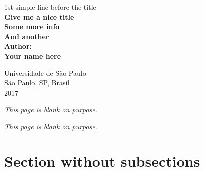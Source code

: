 \documentclass[a4paper,12pt]{article}
\def\DocumentTitle{Give me a nice title}
\def\AuthorName{Your name here}
\begin{document}

\newpage
\thispagestyle{empty}
\newpage
\begingroup
    \centering
    \normalfont\small
    1st simple line before the title
    \fontsize{12}{1}\selectfont %
    \\ [2em]
    \Huge\bfseries\DocumentTitle
    \\ [0.5em] %
    \normalfont\Large
    Some more info
    \\
    And another
    \\ [1.5em] 
    \normalfont\small
    Author:
    \\
    \normalfont\large
    \AuthorName

    \vfill %
    Universidade de São Paulo
    \\ [0.5em]
    São Paulo, SP, Brasil
    \\ [1.5em]
    2017
    \par
\endgroup
\newpage

\newpage
    \thispagestyle{empty}
    \vspace*{\fill} %
    \normalfont\small
    \textit{This page is blank on purpose.}
\newpage %


\tableofcontents %
\listoffigures %
\listoftables %

\newpage
    \vspace*{\fill}\normalfont\small
    \textit{This page is blank on purpose.}
\newpage %


\newpage
\section{Section without subsections}
\end{document}
